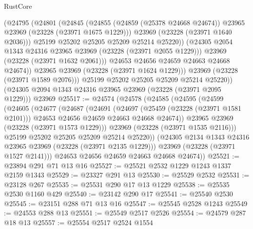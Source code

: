 \begin{lexlean}{RustCore}
\begin{coremodule}
                  (@24795
                    (@24801
                      (@24845
                        (@24855
                          (@24859 (@25378 @24668 @24674))
                          @23965
                          @23969
                          (@23228 (@23971 @1675 @1229)))
                        @23969
                        (@23228 (@23971 @1640 @2036)))
                      @25199
                      @25202
                      @25205
                      @25209
                      @25214
                      @25220))
                  (@24305 @2054 @1343 @24316 @23965 @23969 (@23228 (@23971 @2055 @1229)))
                  @23969
                  (@23228 (@23971 @1632 @2061)))
                @24653
                @24656
                @24659
                @24663
                @24668
                @24674))
            @23965
            @23969
            (@23228 (@23971 @1624 @1229)))
          @23969
          (@23228 (@23971 @1589 @2076)))
        @25199
        @25202
        @25205
        @25209
        @25214
        @25220))
    (@24305 @2094 @1343 @24316 @23965 @23969 (@23228 (@23971 @2095 @1229)))
    @23969
@25517 := @24574
    (@24578
      (@24585
        (@24595
          (@24599
            (@24605
              (@24677
                (@24687
                  (@24691
                    (@24697
                      (@25459 (@23228 (@23971 @1581 @2101)))
                      @24653
                      @24656
                      @24659
                      @24663
                      @24668
                      @24674))
                  @23965
                  @23969
                  (@23228 (@23971 @1573 @1229)))
                @23969
                (@23228 (@23971 @1535 @2116)))
              @25199
              @25202
              @25205
              @25209
              @25214
              @25220))
          (@24305 @2134 @1343 @24316 @23965 @23969 (@23228 (@23971 @2135 @1229)))
          @23969
          (@23228 (@23971 @1527 @2141)))
        @24653
        @24656
        @24659
        @24663
        @24668
        @24674))
@25521 := @23894 @291 @71 @13 @16
@25527 := @25521 @2532 @1229 @1243 @1337 @2159 @1343
@25529 := @23327 @291 @13
@25530 := @25529 @2532
@25531 := @23128 @267
@25535 := @25531 @290 @17 @13 @1229
@25538 := @25535 @2530 @1160 @429
@25540 := @23142 @290 @17
@25541 := @25540 @2530
@25545 := @23151 @288 @71 @13 @16
@25547 := @25545 @2528 @1243
@25549 := @24553 @288 @13
@25551 := @25549 @2517 @2526
@25554 := @24579 @287 @18 @13
@25557 := @25554 @2517 @2524 @1554

\end{coremodule}
\end{lexlean}
